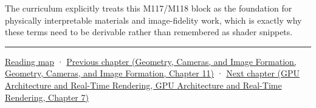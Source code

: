 The curriculum explicitly treats this M117/M118 block as the foundation for physically interpretable materials and image-fidelity work, which is exactly why these terms need to be derivable rather than remembered as shader snippets.

\begin{center}\rule{0.5\linewidth}{0.5pt}\end{center}

\hyperref[volume-reading-map]{Reading map} · \href{../03-Geometry-Cameras-and-Image-Formation/main.pdf\#nameddest=03-visual-computing-i-ch004-sampling-filtering-and-reconstruction}{Previous chapter (Geometry, Cameras, and Image Formation, Geometry, Cameras, and Image Formation, Chapter 11)} · \href{../06-GPU-Architecture-and-Real-Time-Rendering/main.pdf\#nameddest=03-visual-computing-i-ch006-from-material-data-to-gpu-bindings}{Next chapter (GPU Architecture and Real-Time Rendering, GPU Architecture and Real-Time Rendering, Chapter 7)}
